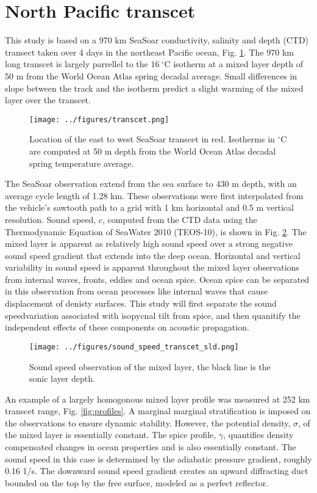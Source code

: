 \documentclass[preprint,NumberedRefs]{JASA}
\begin{document}
\section{North Pacific transcet}\label{sec:transcet}
This study is based on a 970 km SeaSoar conductivity, salinity and depth (CTD) transect taken over 4 days in the northeast Pacific ocean\citep{cole2010seasonal}, Fig. \ref{fig:transcet}. The 970 km long transcet is largely parrellel to the $16 \ ^\circ$C isotherm at a mixed layer depth of 50 m from the World Ocean Atlas spring decadal average. Small differences in slope between the track and the isotherm predict a slight warming of the mixed layer over the transcet.

\begin{figure}
\texttt{[image: ../figures/transcet.png]}
    \caption{\label{fig:transcet}{Location of the east to west SeaSoar transcet in red. Isotherms in $^\circ$C are computed at 50 m depth from the World Ocean Atlas decadal spring temperature average.}}
\end{figure}

The SeaSoar observation\citep{colosi2020observations} extend from the sea surface to 430 m depth, with an average cycle length of 1.28 km. These observations were first interpolated from the vehicle's sawtooth path to a grid with 1 km horizontal and 0.5 m vertical resolution. Sound speed, $c$, computed from the CTD data using the Thermodynamic Equation of SeaWater 2010 (TEOS-10), is shown in Fig. \ref{fig:c_grid}. The mixed layer is apparent as relatively high sound speed over a strong negative sound speed gradient that extends into the deep ocean. Horizontal and vertical variability in sound speed is apparent throughout the mixed layer observations from internal waves, fronts, eddies and ocean spice\citep{colosi2020observations}. Ocean spice can be separated in this observation from ocean processes like internal waves that cause displacement of denisty surfaces\citep{dzieciuch2004}. This study will first separate the sound speedvariation associated with isopycnal tilt from spice, and then quanitify the independent effects of these components on acoustic propagation.

\begin{figure}
\texttt{[image: ../figures/sound\_speed\_transcet\_sld.png]}
\caption{\label{fig:c_grid}{Sound speed observation of the mixed layer, the black line is the sonic layer depth.}}
\end{figure}

An example of a largely homogonous mixed layer profile was measured at 252 km transcet range, Fig. \ref{fig:profiles}. A marginal marginal stratification is imposed on the observations to ensure dynamic stability\citep{}. However, the potential density, $\sigma$, of the mixed layer is essentially constant. The spice profile, $\gamma$, quantifies density compensated changes in ocean properties and is also essentially constant. The sound speed in this case is determined by the adiabatic pressure gradient, roughly 0.16 1/s. The downward sound speed gradient creates an upward diffracting duct bounded on the top by the free surface, modeled as a perfect reflector.
\end{document}
